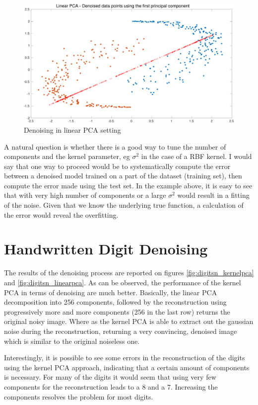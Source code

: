 \documentclass[11pt, a4paper]{article}
\begin{document}
\begin{figure}[H]
  \centering
  \includegraphics[scale=.30]{kpca_linear.pdf}
  \caption{Denoising in linear PCA setting}
  \label{fig:kpca_linear}
\end{figure}

A natural question is whether there is a good way to tune the number
of components and the kernel parameter, eg $\sigma^2$ in the case of a
RBF kernel. I would say that one way to proceed would be to
systematically compute the error between a denoised model trained on a
part of the dataset (training set), then compute the error made using
the test set. In the example above, it is easy to see that with very
high number of components or a large $\sigma^2$ would result in a
fitting of the noise. Given that we know the underlying true function,
a calculation of the error would reveal the overfitting.

\section{Handwritten Digit Denoising}

The results of the denoising process are reported on figures
\ref{fig:digitsn_kernelpca} and \ref{fig:digitsn_linearpca}. As can be
observed, the performance of the kernel PCA in terms of denoising are
much better. Basically, the linear PCA decomposition into 256
components, followed by the reconstruction using progressively more
and more components (256 in the last row) returns the original noisy
image. Where as the kernel PCA is able to extract out the gaussian
noise during the reconstruction, returning a very convincing, denoised
image which is similar to the original noiseless one.

Interestingly, it is possible to see some errors in the reconstruction
of the digits using the kernel PCA approach, indicating that a certain
amount of components is necessary. For many of the digits it would
seem that using very few components for the reconstruction leads to a
8 and a 7. Increasing the components resolves the problem for most
digits.
\end{document}
